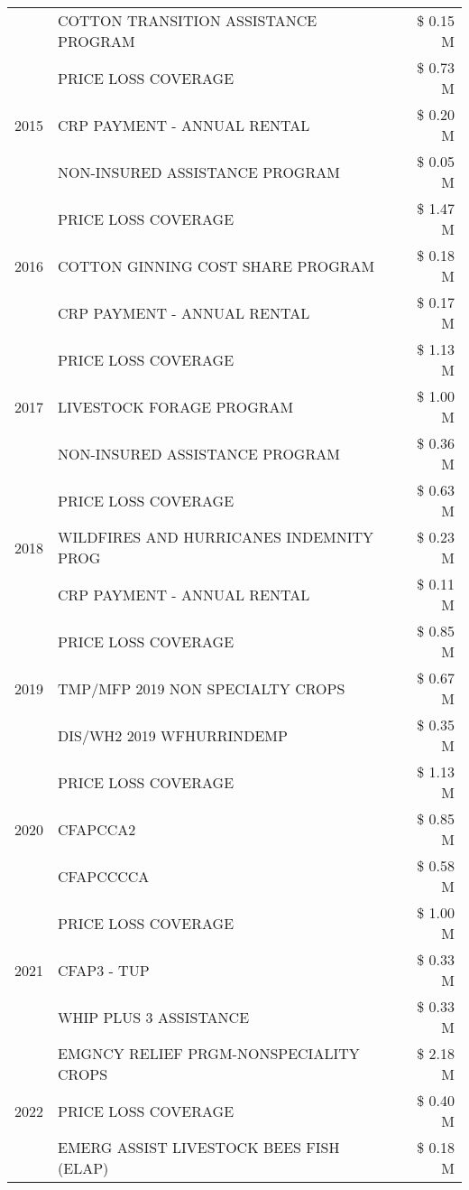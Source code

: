 \begin{tabular}{llr}
 & COTTON TRANSITION ASSISTANCE PROGRAM & \$ 0.15 M \\
\cline{1-3}
\multirow[t]{3}{*}{2015} & PRICE LOSS COVERAGE & \$ 0.73 M \\
 & CRP PAYMENT - ANNUAL RENTAL & \$ 0.20 M \\
 & NON-INSURED ASSISTANCE PROGRAM & \$ 0.05 M \\
\cline{1-3}
\multirow[t]{3}{*}{2016} & PRICE LOSS COVERAGE & \$ 1.47 M \\
 & COTTON GINNING COST SHARE PROGRAM & \$ 0.18 M \\
 & CRP PAYMENT - ANNUAL RENTAL & \$ 0.17 M \\
\cline{1-3}
\multirow[t]{3}{*}{2017} & PRICE LOSS COVERAGE & \$ 1.13 M \\
 & LIVESTOCK FORAGE PROGRAM & \$ 1.00 M \\
 & NON-INSURED ASSISTANCE PROGRAM & \$ 0.36 M \\
\cline{1-3}
\multirow[t]{3}{*}{2018} & PRICE LOSS COVERAGE & \$ 0.63 M \\
 & WILDFIRES AND HURRICANES INDEMNITY PROG & \$ 0.23 M \\
 & CRP PAYMENT - ANNUAL RENTAL & \$ 0.11 M \\
\cline{1-3}
\multirow[t]{3}{*}{2019} & PRICE LOSS COVERAGE & \$ 0.85 M \\
 & TMP/MFP 2019 NON SPECIALTY CROPS & \$ 0.67 M \\
 & DIS/WH2 2019 WFHURRINDEMP & \$ 0.35 M \\
\cline{1-3}
\multirow[t]{3}{*}{2020} & PRICE LOSS COVERAGE & \$ 1.13 M \\
 & CFAPCCA2 & \$ 0.85 M \\
 & CFAPCCCCA & \$ 0.58 M \\
\cline{1-3}
\multirow[t]{3}{*}{2021} & PRICE LOSS COVERAGE & \$ 1.00 M \\
 & CFAP3 - TUP & \$ 0.33 M \\
 & WHIP PLUS 3 ASSISTANCE & \$ 0.33 M \\
\cline{1-3}
\multirow[t]{3}{*}{2022} & EMGNCY RELIEF PRGM-NONSPECIALITY CROPS & \$ 2.18 M \\
 & PRICE LOSS COVERAGE & \$ 0.40 M \\
 & EMERG ASSIST LIVESTOCK BEES FISH (ELAP) & \$ 0.18 M \\
\cline{1-3}
\bottomrule
\end{tabular}
